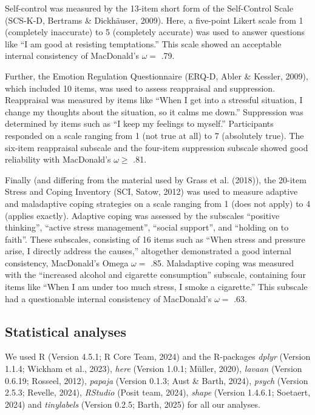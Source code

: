 \documentclass[
  man]{apa6}
\begin{document}
Self-control was measured by the 13-item short form of the Self-Control Scale (SCS-K-D, Bertrams \& Dickhäuser, 2009).
Here, a five-point Likert scale from 1 (completely inaccurate) to 5 (completely accurate) was used to answer questions like ``I am good at resisting temptations.''
This scale showed an acceptable internal consistency of MacDonald's \(\omega=\) .79.

Further, the Emotion Regulation Questionnaire (ERQ-D, Abler \& Kessler, 2009), which included 10 items, was used to assess reappraisal and suppression. Reappraisal was measured by items like ``When I get into a stressful situation, I change my thoughts about the situation, so it calms me down.''
Suppression was determined by items such as ``I keep my feelings to myself.''
Participants responded on a scale ranging from 1 (not true at all) to 7 (absolutely true).
The six-item reappraisal subscale and the four-item suppression subscale showed good reliability with MacDonald's \(\omega\ge\) .81.

Finally (and differing from the material used by Grass et al. (2018)), the 20-item Stress and Coping Inventory (SCI, Satow, 2012) was used to measure adaptive and maladaptive coping strategies on a scale ranging from 1 (does not apply) to 4 (applies exactly).
Adaptive coping was assessed by the subscales ``positive thinking'', ``active stress management'', ``social support'', and ``holding on to faith''.
These subscales, consisting of 16 items such as ``When stress and pressure arise, I directly address the causes,'' altogether demonstrated a good internal consistency, MacDonald's Omega \(\omega=\) .85.
Maladaptive coping was measured with the ``increased alcohol and cigarette consumption'' subscale, containing four items like ``When I am under too much stress, I smoke a cigarette.''
This subscale had a questionable internal consistency of MacDonald's \(\omega=\) .63.

\subsection{Statistical analyses}\label{statistical-analyses}

We used R (Version 4.5.1; R Core Team, 2024) and the R-packages \emph{dplyr} (Version 1.1.4; Wickham et al., 2023), \emph{here} (Version 1.0.1; Müller, 2020), \emph{lavaan} (Version 0.6.19; Rosseel, 2012), \emph{papaja} (Version 0.1.3; Aust \& Barth, 2024), \emph{psych} (Version 2.5.3; Revelle, 2024), \emph{RStudio} (Posit team, 2024), \emph{shape} (Version 1.4.6.1; Soetaert, 2024) and \emph{tinylabels} (Version 0.2.5; Barth, 2025) for all our analyses.
\end{document}

